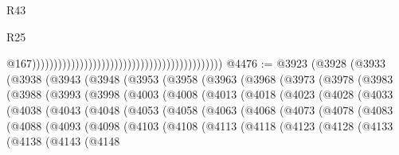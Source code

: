 \begin{lexlean}{R43}
\begin{lexlean}{R25}
\begin{coremodule}
{{{{{{{{{{{{{{{{{{{{{{{{{{{{{{{{{{{{{{{{{{{{{{{{{{{{{{{{{{{{{{{{{{{{{{{{{{{{{{{{{{{{{{{{{{{{{{{{{{{{{{{{{{{{{{{{{{{{{{{{{{{{{{{{{{{{{{{{{{{{{{{{{{{{{{{{{{{{{{{{{{{{{{{{{{{{{{{{{{{{{{{{{{{{{{{{{                                                                                            @167))))))))))))))))))))))))))))))))))))))))))))
@4476 := @3923
    (@3928
      (@3933
        (@3938
          (@3943
            (@3948
              (@3953
                (@3958
                  (@3963
                    (@3968
                      (@3973
                        (@3978
                          (@3983
                            (@3988
                              (@3993
                                (@3998
                                  (@4003
                                    (@4008
                                      (@4013
                                        (@4018
                                          (@4023
                                            (@4028
                                              (@4033
                                                (@4038
                                                  (@4043
                                                    (@4048
                                                      (@4053
                                                        (@4058
                                                          (@4063
                                                            (@4068
                                                              (@4073
                                                                (@4078
                                                                  (@4083
                                                                    (@4088
                                                                      (@4093
                                                                        (@4098
                                                                          (@4103
                                                                            (@4108
                                                                              (@4113
                                                                                (@4118
                                                                                  (@4123
                                                                                    (@4128
                                                                                      (@4133
                                                                                        (@4138
                                                                                          (@4143
                                                                                            (@4148
}}}}}}}}}}}}}}}}}}}}}}}}}}}}}}}}}}}}}}}}}}}}}}}}}}}}}}}}}}}}}}}}}}}}}}}}}}}}}}}}}}}}}}}}}}}}}}}}}}}}}}}}}}}}}}}}}}}}}}}}}}}}}}}}}}}}}}}}}}}}}}}}}}}}}}}}}}}}}}}}}}}}}}}}}}}}}}}}}}}}}}}}}}}}}}}}}
\end{coremodule}
\end{lexlean}
\end{lexlean}
